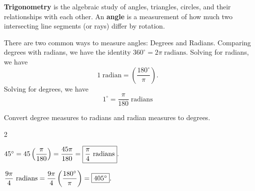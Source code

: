 \documentclass{book}
\begin{document}
%
%

\begin{Def} \textbf{Trigonometry} is the algebraic study of angles, triangles, circles, and their relationships with each other. An \textbf{angle} is a measurement of how much two intersecting line segments (or rays) differ by rotation.\end{Def}\vs

There are two common ways to measure angles: Degrees and Radians. Comparing degrees with radians, we have the identity $360^\circ = 2\pi\;\mbox{radians}$. Solving for radians, we have \begin{equation} 1\;\mbox{radian} = \left(\dfrac{180^\circ}{\pi}\right).\end{equation} Solving for degrees, we have \begin{equation} 1^\circ = \dfrac{\pi}{180}\;\mbox{radians}\end{equation}

\begin{Exam} Convert degree measures to radians and radian measures to degrees.
\begin{enumerate}
\begin{multicols}{2}
\item $45^\circ = 45\left(\dfrac{\pi}{180}\right) = \dfrac{45\pi}{180} = \fbox{$\dfrac{\pi}{4}$ radians}.$
\item $\dfrac{9\pi}{4}\text{ radians} = \dfrac{9\pi}{4}\left(\dfrac{180^\circ}{\pi}\right) = \fbox{$405^\circ$}.$
\end{multicols}
\end{enumerate}
\end{Exam}\vs
\end{document}
